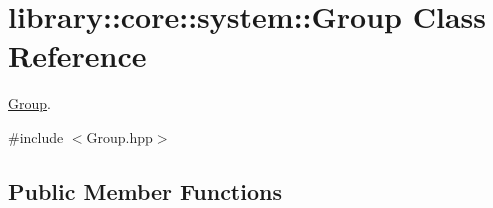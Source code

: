 \hypertarget{classlibrary_1_1core_1_1system_1_1_group}{}\section{library\+:\+:core\+:\+:system\+:\+:Group Class Reference}
\label{classlibrary_1_1core_1_1system_1_1_group}


\hyperlink{classlibrary_1_1core_1_1system_1_1_group}{Group}.  




{\ttfamily \#include $<$Group.\+hpp$>$}

\subsection*{Public Member Functions}
